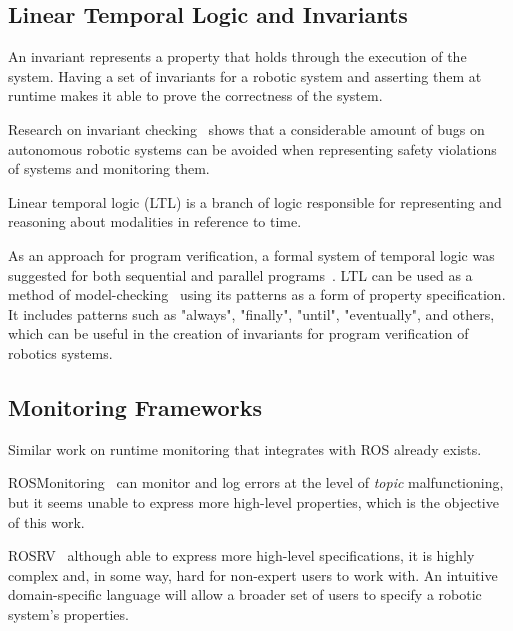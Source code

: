 \subsection{Linear Temporal Logic and Invariants}
\label{ssec:ltlinvariants}

An invariant represents a property that holds through the execution of the system. Having a set of invariants for a robotic system and asserting them at runtime makes it able to prove the correctness of the system.

Research on invariant checking~\cite{zizyte2021importance} shows that a considerable amount of bugs on autonomous robotic systems can be avoided when representing safety violations of systems and monitoring them.

Linear temporal logic (LTL) is a branch of logic responsible for representing and reasoning about modalities in reference to time. 

As an approach for program verification, a formal system of temporal logic was suggested for both sequential and parallel programs~\cite{pnueli1977temporal}. LTL can be used as a method of model-checking~\cite{dwyer1998property} using its patterns as a form of property specification. It includes patterns such as "always", "finally", "until", "eventually", and others, which can be useful in the creation of invariants for program verification of robotics systems.


\subsection{Monitoring Frameworks}
\label{ssec:monitoringframeworks}

Similar work on runtime monitoring that integrates with ROS already exists. 

ROSMonitoring~\cite{ferrando2020rosmonitoring} can monitor and log errors at the level of \textit{topic} malfunctioning, but it seems unable to express more high-level properties, which is the objective of this work. 

ROSRV~\cite{huang2014rosrv} although able to express more high-level specifications, it is highly complex and, in some way, hard for non-expert users to work with. An intuitive domain-specific language will allow a broader set of users to specify a robotic system's properties. 

